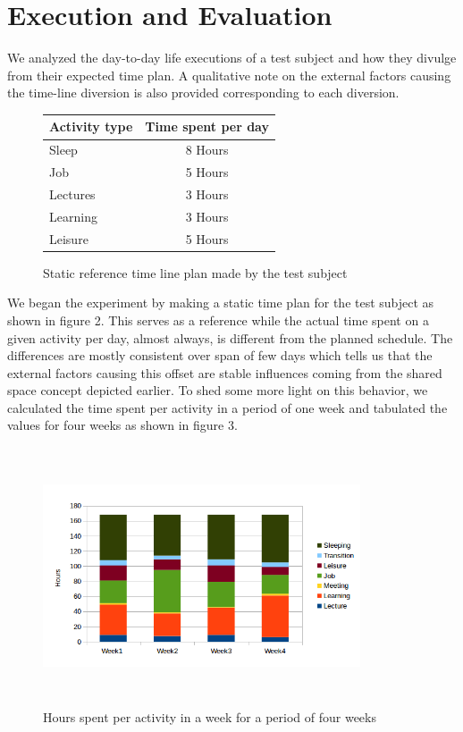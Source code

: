 \documentclass[conference]{IEEEtran}
\begin{document}
\section{Execution and Evaluation}
We analyzed the day-to-day life executions of a test subject and how they divulge from their expected time plan. A qualitative note on the external factors causing the time-line diversion is also provided corresponding to each diversion.


\begin{figure}[hb]
  \centering
	  \begin{tabular}{ | l | c | }
		\hline
		\textbf{Activity type} 	& \textbf{Time spent per day} 	\\ \hline
		Sleep					& 	8 Hours						\\ \hline
		Job						& 	5 Hours						\\ \hline
		Lectures				& 	3 Hours						\\ \hline
		Learning				& 	3 Hours						\\ \hline
		Leisure					& 	5 Hours						\\ \hline
	  \end{tabular} 
  \caption[]
   {Static reference time line plan made by the test subject}
\end{figure}

We began the experiment by making a static time plan for the test subject as shown in figure 2. This serves as a reference while the actual time spent on a given activity per day, almost always, is different from the planned schedule. The differences are mostly consistent over span of few days which tells us that the external factors causing this offset are stable influences coming from the shared space concept depicted earlier. To shed some more light on this behavior, we calculated the time spent per activity in a period of one week and tabulated the values for four weeks as shown in figure 3. 

\begin{figure}[hb]
  \centering
  \includegraphics[width=3.7in, height=3.0in]{bar}
  \caption[]
   {Hours spent per activity in a week for a period of four weeks}
\end{figure}
\end{document}
